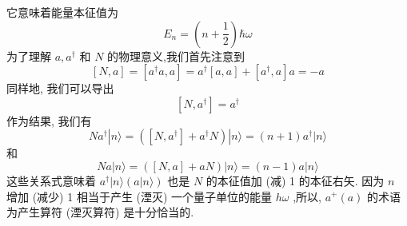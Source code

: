 	它意味着能量本征值为
	\begin{equation}
{E}_{n} = \left( {n + \frac{1}{2}}\right) \hbar \omega
\end{equation}
为了理解 $a,{a}^{ \dagger }$ 和 $N$ 的物理意义,我们首先注意到
\begin{equation}
\left\lbrack {N, a}\right\rbrack = \left\lbrack {{a}^{ \dagger }a, a}\right\rbrack = {a}^{ \dagger }\left\lbrack {a, a}\right\rbrack + \left\lbrack {{a}^{ \dagger }, a}\right\rbrack a = - a
\end{equation}
同样地, 我们可以导出
\begin{equation}
\left\lbrack {N,{a}^{ \dagger }}\right\rbrack = {a}^{ \dagger }
\end{equation}
作为结果, 我们有
\begin{equation}
N{a}^{ \dagger }| {n\rangle = \left( {\left\lbrack {N,{a}^{ \dagger }}\right\rbrack + {a}^{ \dagger }N}\right) }| n\rangle = \left( {n + 1}\right) {a}^{ \dagger }|n\rangle
\end{equation}
和
\begin{equation}
{Na}\left| {n\rangle = \left( {\left\lbrack {N, a}\right\rbrack + {aN}}\right) }\right| n\rangle = \left( {n - 1}\right) a|n\rangle
\end{equation}
这些关系式意味着 ${a}^\dagger\left| {n\rangle \left( a | n\rangle\right) }$ 也是 $N$ 的本征值加 (减) 1 的本征右矢. 因为 $n$ 增加 (减少) 1 相当于产生 (湮灭) 一个量子单位的能量 ${h\omega }$ ,所以, ${a}^{ + }\left( a\right)$ 的术语为产生算符 (湮灭算符) 是十分恰当的.

